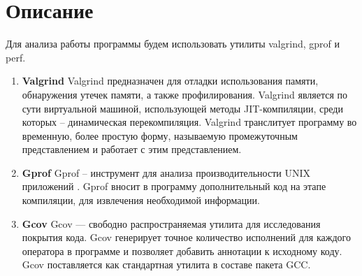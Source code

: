 \section{Описание}


Для анализа работы программы будем использовать утилиты valgrind, gprof и perf.
\begin{enumerate}
    \item \textbf{Valgrind} \newline
    Valgrind предназначен для отладки использования памяти, обнаружения утечек памяти, а также профилирования. Valgrind является по сути виртуальной машиной,
    использующей методы JIT-компиляции, среди которых – динамическая перекомпиляция. Valgrind транслитует программу во временную, более простую форму, называемую промежуточным представлением и работает с этим представлением.
    \item \textbf{Gprof} \newline
    Gprof – инструмент для анализа производительности UNIX приложений . Gprof вносит в программу дополнительный код на этапе компиляции, для извлечения необходимой информации.
    \item \textbf{Gcov} \newline
    Gcov — свободно распространяемая утилита для исследования покрытия кода. Gcov генерирует точное количество исполнений для каждого оператора в программе и позволяет добавить аннотации к исходному коду. Gcov поставляется как стандартная утилита в составе пакета GCC.
\end{enumerate}

\pagebreak

